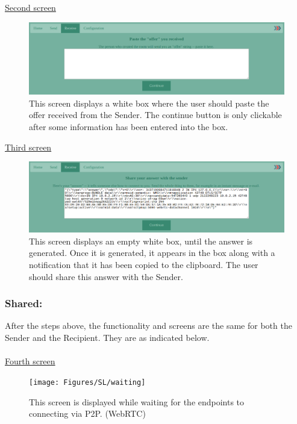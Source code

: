 %
\noindent
\underline{Second screen}
\begin{figure}[H]
  \centering
  \includegraphics[width=\textwidth]{Figures/SL/receiver_offer}
  \decoRule
  \caption[Enter offer screen]{This screen displays a white box where the user should paste the offer received from the Sender. The continue button is only clickable after some information has been entered into the box.}
  \label{fig:serv_r_off}
\end{figure}

%
\noindent
\underline{Third screen}
\begin{figure}[H]
  \centering
  \includegraphics[width=\textwidth]{Figures/SL/answer}
  \decoRule
  \caption[Answer screen]{This screen displays an empty white box, until the answer is generated. Once it is generated, it appears in the box along with a notification that it has been copied to the clipboard. The user should share this answer with the Sender.}
  \label{fig:serv_r_ans}
\end{figure}

\subsubsection*{Shared:}
After the steps above, the functionality and screens are the same for both the Sender and the Recipient. They are as indicated below.\\
\\
%
\noindent
\underline{Fourth screen}
\begin{figure}[H]
  \centering
  \texttt{[image: Figures/SL/waiting]}
  \decoRule
  \caption[Waiting screen]{This screen is displayed while waiting for the endpoints to connecting via P2P. (WebRTC)}
  \label{fig:SL_wait}
\end{figure}

